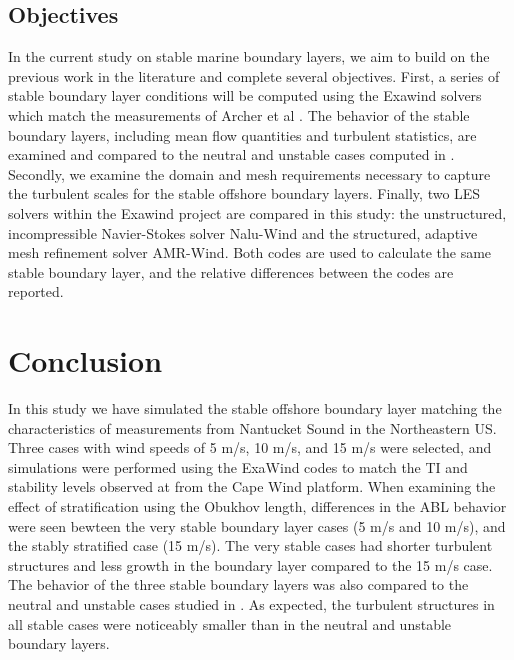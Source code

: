\documentclass[conf]{new-aiaa}
\begin{document}
\subsection{Objectives}
In the current study on stable marine boundary layers, we aim to build
on the previous work in the literature and complete several
objectives.  First, a series of stable boundary layer conditions will
be computed using the Exawind solvers which match the measurements of
Archer et al \cite{archer2016predominance}.  The behavior of the
stable boundary layers, including mean flow quantities and turbulent
statistics, are examined and compared to the neutral and unstable
cases computed in \cite{cheung2020large}.  Secondly, we examine the
domain and mesh requirements necessary to capture the turbulent scales
for the stable offshore boundary layers.  Finally, two LES solvers
within the Exawind project are compared in this study: the
unstructured, incompressible Navier-Stokes solver Nalu-Wind and the
structured, adaptive mesh refinement solver AMR-Wind.  Both codes are
used to calculate the same stable boundary layer, and the relative
differences between the codes are reported.





\section{Conclusion}
In this study we have simulated the stable offshore boundary layer
matching the characteristics of measurements from Nantucket Sound in
the Northeastern US.  Three cases with wind speeds of 5 m/s, 10 m/s,
and 15 m/s were selected, and simulations were performed using the
ExaWind codes to match the TI and stability levels observed at from
the Cape Wind platform.  When examining the effect of stratification
using the Obukhov length, differences in the ABL behavior were seen
bewteen the very stable boundary layer cases (5 m/s and 10 m/s), and
the stably stratified case (15 m/s).  The very stable cases had
shorter turbulent structures and less growth in the boundary layer
compared to the 15 m/s case.  The behavior of the three stable
boundary layers was also compared to the neutral and unstable cases
studied in \cite{cheung2020large}.  As expected, the turbulent
structures in all stable cases were noticeably smaller than in the
neutral and unstable boundary layers.
\end{document}
